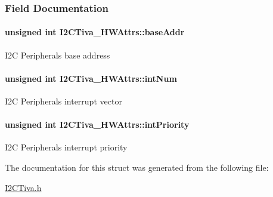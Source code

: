\subsubsection{Field Documentation}
\paragraph[{base\+Addr}]{\setlength{\rightskip}{0pt plus 5cm}unsigned int I2\+C\+Tiva\+\_\+\+H\+W\+Attrs\+::base\+Addr}\label{struct_i2_c_tiva___h_w_attrs_a12ab64360a0c09bbc1324d0935fcb63a}
I2\+C Peripheral\textquotesingle{}s base address 
\paragraph[{int\+Num}]{\setlength{\rightskip}{0pt plus 5cm}unsigned int I2\+C\+Tiva\+\_\+\+H\+W\+Attrs\+::int\+Num}\label{struct_i2_c_tiva___h_w_attrs_adad44a5cf7a642e83e07b364e7623cb3}
I2\+C Peripheral\textquotesingle{}s interrupt vector 
\paragraph[{int\+Priority}]{\setlength{\rightskip}{0pt plus 5cm}unsigned int I2\+C\+Tiva\+\_\+\+H\+W\+Attrs\+::int\+Priority}\label{struct_i2_c_tiva___h_w_attrs_a767c3e84c819ebe48f87e378bb039834}
I2\+C Peripheral\textquotesingle{}s interrupt priority 

The documentation for this struct was generated from the following file\+:\begin{DoxyCompactItemize}
\item 
\hyperlink{_i2_c_tiva_8h}{I2\+C\+Tiva.\+h}\end{DoxyCompactItemize}
